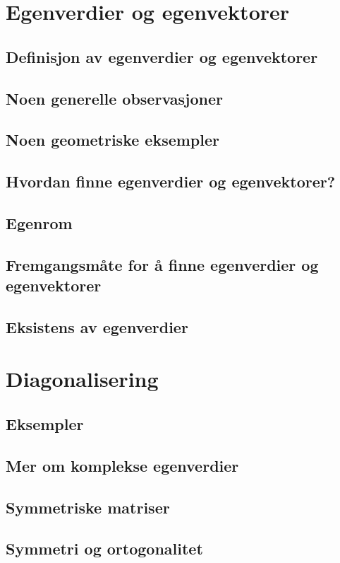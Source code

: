 \documentclass{article}
\begin{document}
\section{Egenverdier og egenvektorer}

\subsection{Definisjon av egenverdier og egenvektorer}
\subsection{Noen generelle observasjoner}
\subsection{Noen geometriske eksempler}
\subsection{Hvordan finne egenverdier og egenvektorer?}
\subsection{Egenrom}
\subsection{Fremgangsmåte for å finne egenverdier og egenvektorer}
\subsection{Eksistens av egenverdier}


\section{Diagonalisering}

\subsection{Eksempler}
\subsection{Mer om komplekse egenverdier}
\subsection{Symmetriske matriser}
\subsection{Symmetri og ortogonalitet}
\end{document}
